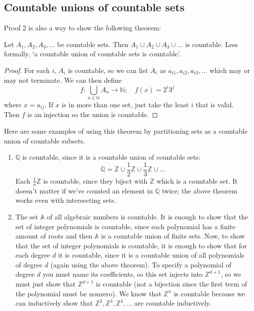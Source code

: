 \subsection{Countable unions of countable sets}
Proof 2 is also a way to show the following theorem:
\begin{theorem}
	Let \(A_1, A_2, A_3, \dots\) be countable sets.
	Then \(A_1 \cup A_2 \cup A_3 \cup \dots\) is countable.
	Less formally, `a countable union of countable sets is countable'.
\end{theorem}
\begin{proof}
	For each \(i\), \(A_i\) is countable, so we can list \(A_i\) as \(a_{i1}, a_{i2}, a_{i3}, \dots\) which may or may not terminate.
	We can then define
	\[
		f\colon \bigcup_{n \in \mathbb N}A_n \to \mathbb N;\quad f(x) = 2^i 3^j
	\]
	where \(x = a_{ij}\).
	If \(x\) is in more than one set, just take the least \(i\) that is valid.
	Then \(f\) is an injection so the union is countable.
\end{proof}
Here are some examples of using this theorem by partitioning sets as a countable union of countable subsets.
\begin{enumerate}
	\item \(\mathbb Q\) is countable, since it is a countable union of countable sets:
	      \[
		      \mathbb Q = \mathbb Z \cup \frac{1}{2}\mathbb Z \cup \frac{1}{3}\mathbb Z \cup \dots
	      \]
	      Each \(\frac{1}{n}\mathbb Z\) is countable, since they biject with \(\mathbb Z\) which is a countable set.
	      It doesn't matter if we've counted an element in \(\mathbb Q\) twice; the above theorem works even with intersecting sets.
	\item The set \(\mathbb A\) of all algebraic numbers is countable.
	      It is enough to show that the set of integer polynomials is countable, since each polynomial has a finite amount of roots and then \(\mathbb A\) is a countable union of finite sets.
	      Now, to show that the set of integer polynomials is countable, it is enough to show that for each degree \(d\) it is countable, since it is a countable union of all polynomials of degree \(d\) (again using the above theorem).
	      To specify a polynomial of degree \(d\) you must name its coefficients, so this set injects into \(\mathbb Z^{d+1}\), so we must just show that \(\mathbb Z^{d+1}\) is countable (not a bijection since the first term of the polynomial must be nonzero).
	      We know that \(\mathbb Z^n\) is countable because we can inductively show that \(\mathbb Z^2, \mathbb Z^3, \mathbb Z^4, \dots\) are countable inductively.
\end{enumerate}

